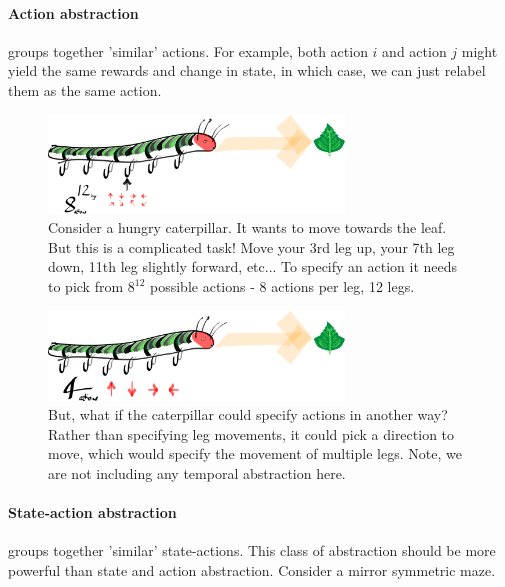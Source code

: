 \newpage
\paragraph{Action abstraction} groups together 'similar' actions. For
example, both action $i$ and action $j$ might yield the same rewards and change in state,
in which case, we can just relabel them as the same action.

\begin{figure}[h!]
\centering
\includegraphics[width=0.7\textwidth,height=0.175\textheight]{../../pictures/drawings/hungry-caterpillar.png}
\caption{Consider a hungry caterpillar. It wants to move towards the leaf.
But this is a complicated task! Move your 3rd leg up, your 7th leg down, 11th leg slightly forward, etc...
To specify an action it needs to pick from $8^{12}$ possible actions - 8 actions per leg, 12 legs.}
\end{figure}


\begin{figure}[h!]
\centering
\includegraphics[width=0.7\textwidth,height=0.175\textheight]{../../pictures/drawings/full-caterpillar.png}
\caption{But, what if the caterpillar could specify actions in another way? Rather than specifying leg movements, it could pick a direction to move, which would specify the movement of multiple legs. Note, we are not including any temporal abstraction here.}
\end{figure}

\paragraph{State-action abstraction} groups together 'similar' state-actions.
This class of abstraction should be more powerful than state and action abstraction. Consider a mirror symmetric maze.

